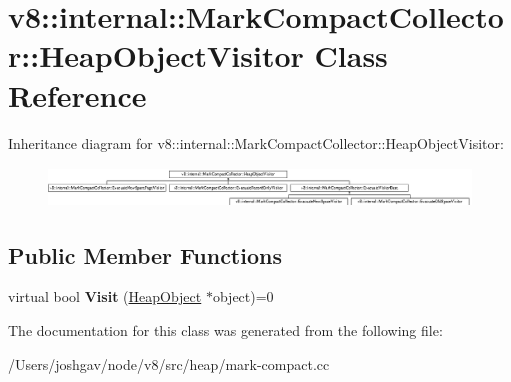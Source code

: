 \hypertarget{classv8_1_1internal_1_1_mark_compact_collector_1_1_heap_object_visitor}{}\section{v8\+:\+:internal\+:\+:Mark\+Compact\+Collector\+:\+:Heap\+Object\+Visitor Class Reference}
\label{classv8_1_1internal_1_1_mark_compact_collector_1_1_heap_object_visitor}
Inheritance diagram for v8\+:\+:internal\+:\+:Mark\+Compact\+Collector\+:\+:Heap\+Object\+Visitor\+:\begin{figure}[H]
\begin{center}
\leavevmode
\includegraphics[height=1.044776cm]{classv8_1_1internal_1_1_mark_compact_collector_1_1_heap_object_visitor}
\end{center}
\end{figure}
\subsection*{Public Member Functions}
\begin{DoxyCompactItemize}
\item 
virtual bool {\bfseries Visit} (\hyperlink{classv8_1_1internal_1_1_heap_object}{Heap\+Object} $\ast$object)=0\hypertarget{classv8_1_1internal_1_1_mark_compact_collector_1_1_heap_object_visitor_a97ebc71200b627168bf331c0be3d4c8d}{}\label{classv8_1_1internal_1_1_mark_compact_collector_1_1_heap_object_visitor_a97ebc71200b627168bf331c0be3d4c8d}

\end{DoxyCompactItemize}


The documentation for this class was generated from the following file\+:\begin{DoxyCompactItemize}
\item 
/\+Users/joshgav/node/v8/src/heap/mark-\/compact.\+cc\end{DoxyCompactItemize}

